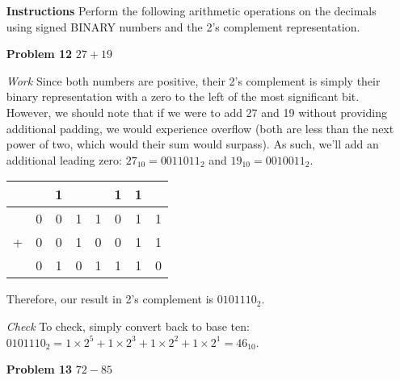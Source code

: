 \documentclass[12pt]{article}
\begin{document}
\begin{enumerate}
  \item[\textbf{Instructions}] Perform the following arithmetic operations on the decimals using signed BINARY numbers and the 2’s complement representation.
\end{enumerate}

\begin{enumerate}
  \item[\textbf{Problem 12}] $27+19$
\end{enumerate}

\begin{enumerate}
  \item[\textit{Work}] Since both numbers are positive, their 2's complement is simply their binary representation with a zero to the left of the most significant bit. However, we should note that if we were to add 27 and 19 without providing additional padding, we would experience overflow (both are less than the next power of two, which would their sum would surpass). As such, we'll add an additional leading zero: $27_{10} = 0011011_2$ and $19_{10} = 0010011_2$.
  \item[]
  \begin{center}
    \begin{tabular}{c@{\,}c@{\,}c@{\,}c@{\,}c@{\,}c@{\,}c@{\,}c}
      &   & 1 &   &   & 1 & 1 &   \\    \hline
      & 0 & 0 & 1 & 1 & 0 & 1 & 1 \\
    + & 0 & 0 & 1 & 0 & 0 & 1 & 1 \\    \hline
      & 0 & 1 & 0 & 1 & 1 & 1 & 0
    \end{tabular}
  \end{center}
  \item[] Therefore, our result in 2's complement is $0101110_2$.
  \item[\textit{Check}] To check, simply convert back to base ten: $0101110_2 = 1\times2^5+1\times2^3+1\times2^2+1\times2^1=46_{10}$.
\end{enumerate}


\begin{enumerate}
  \item[\textbf{Problem 13}] $72-85$
\end{enumerate}
\end{document}
